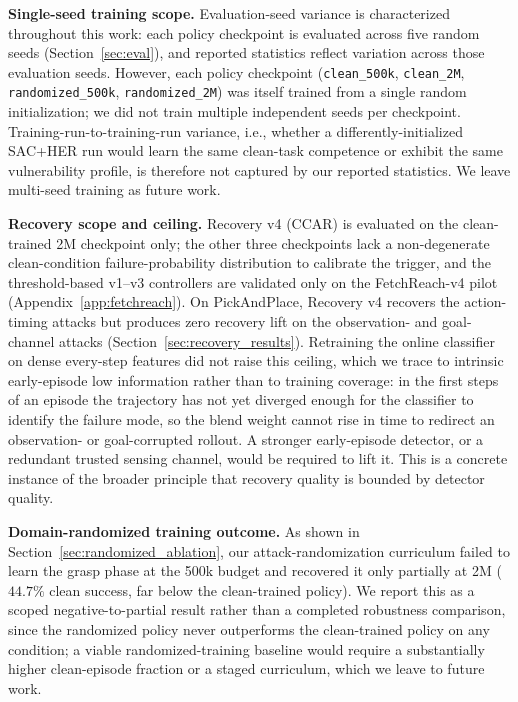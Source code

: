 \documentclass[conference]{IEEEtran}
\begin{document}
\textbf{Single-seed training scope.}
Evaluation-seed variance is characterized throughout this work: each policy checkpoint
is evaluated across five random seeds (Section~\ref{sec:eval}), and reported statistics
reflect variation across those evaluation seeds. However, each policy checkpoint
(\texttt{clean\_500k}, \texttt{clean\_2M}, \texttt{randomized\_500k},
\texttt{randomized\_2M}) was itself trained from a single random initialization; we did
not train multiple independent seeds per checkpoint. Training-run-to-training-run
variance, i.e., whether a differently-initialized SAC+HER run would learn the same
clean-task competence or exhibit the same vulnerability profile, is therefore not
captured by our reported statistics. We leave multi-seed training as future work.

\textbf{Recovery scope and ceiling.}
Recovery v4 (CCAR) is evaluated on the clean-trained 2M checkpoint only; the other three
checkpoints lack a non-degenerate clean-condition failure-probability distribution to
calibrate the trigger, and the threshold-based v1--v3 controllers are validated only on
the FetchReach-v4 pilot (Appendix~\ref{app:fetchreach}). On PickAndPlace, Recovery v4
recovers the action-timing attacks but produces zero recovery lift on the observation-
and goal-channel attacks (Section~\ref{sec:recovery_results}). Retraining the online
classifier on dense every-step features did not raise this ceiling, which we trace to
intrinsic early-episode low information rather than to training coverage: in the first
steps of an episode the trajectory has not yet diverged enough for the classifier to
identify the failure mode, so the blend weight cannot rise in time to redirect an
observation- or goal-corrupted rollout. A stronger early-episode detector, or a redundant
trusted sensing channel, would be required to lift it. This is a concrete instance of the
broader principle that recovery quality is bounded by detector quality.

\textbf{Domain-randomized training outcome.}
As shown in Section~\ref{sec:randomized_ablation}, our attack-randomization curriculum
failed to learn the grasp phase at the 500k budget and recovered it only partially at 2M
($44.7\%$ clean success, far below the clean-trained policy). We report this as a
scoped negative-to-partial result rather than a completed robustness comparison, since
the randomized policy never outperforms the clean-trained policy on any condition; a
viable randomized-training baseline would require a substantially higher clean-episode
fraction or a staged curriculum, which we leave to future work.
\end{document}
